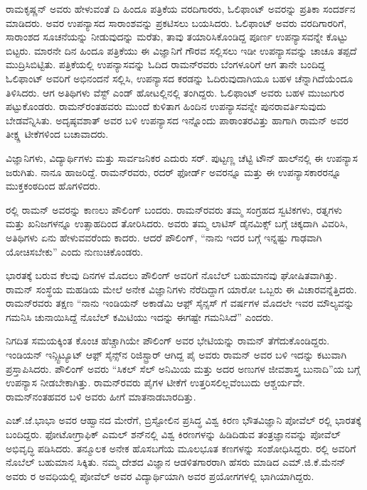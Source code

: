 ರಾಮಕೃಷ್ಣನ್ ಅವರು ಹೇಳುವಂತೆ ದಿ ಹಿಂದೂ ಪತ್ರಿಕೆಯ ವರದಿಗಾರರು, ಓಲಿಫಾಂಟ್ ಅವರನ್ನು ಪ್ರತಿಕಾ ಸಂದರ್ಶನ ಮಾಡಿದರು. ಅವರ ಉಪನ್ಯಾಸದ ಸಾರಾಂಶವನ್ನು ಪ್ರಕಟಿಸಲು ಬಯಸಿದರು. ಓಲಿಫಾಂಟ್ ಅವರು ವರದಿಗಾರರಿಗೆ, ಸಾರಾಂಶದ ಸೂಚನೆಯನ್ನು ನೀಡುವುದನ್ನು ಮರೆತು, ತಾವು ತಯಾರಿಸಿಕೊಂಡಿದ್ದ ಪೂರ್ಣ ಉಪನ್ಯಾಸವನ್ನೇ ಕೊಟ್ಟು ಬಿಟ್ಟರು. ಮಾರನೇ ದಿನ ಹಿಂದೂ ಪತ್ರಿಕೆಯು ಈ ವಿಜ್ಞಾನಿಗೆ ಗೌರವ ಸಲ್ಲಿಸಲು ಇಡೀ ಉಪನ್ಯಾಸವನ್ನು ಚಾಚೂ ತಪ್ಪದೆ ಮುದ್ರಿಸಿಬಿಟ್ಟಿತು. ಪತ್ರಿಕೆಯಲ್ಲಿ ಉಪನ್ಯಾಸವನ್ನು ಓದಿದ ರಾಮನ್‍ರವರು ಬೆಂಗಳೂರಿಗೆ ಆಗ ತಾನೇ ಬಂದಿದ್ದ ಓಲಿಫಾಂಟ್ ಅವರಿಗೆ ಅಭಿನಂದನೆ ಸಲ್ಲಿಸಿ, ಉಪನ್ಯಾಸದ ಕರಡನ್ನು ಓದಿರುವುದಾಗಿಯೂ ಬಹಳ ಚೆನ್ನಾಗಿದೆಯೆಂದೂ ತಿಳಿಸಿದರು. ಆಗ ಅತಿಥಿಗಳು ವೆಸ್ಟ್ ಎಂಡ್ ಹೋಟಲ್ಲಿನಲ್ಲಿ ತಂಗಿದ್ದರು. ಓಲಿಫಾಂಟ್ ಅವರು ಬಹಳ ಮುಜುಗುರ ಪಟ್ಟುಕೊಂಡರು. ರಾಮನ್‍ರಂತಹವರು ಮುಂದೆ ಕುಳಿತಾಗ ಹಿಂದಿನ ಉಪನ್ಯಾಸವನ್ನೇ ಪುನರಾವರ್ತಿಸುವುದು ಬೇಡವೆನ್ನಿಸಿತು. ಅದೃಷ್ಠವಶಾತ್ ಅವರ ಬಳಿ ಉಪನ್ಯಾಸದ ಇನ್ನೊಂದು ಪಾಠಾಂತರವಿತ್ತು ಹಾಗಾಗಿ ರಾಮನ್ ಅವರ ತೀಕ್ಷ್ಣ ಟೀಕೆಗಳಿಂದ ಬಚಾವಾದರು.

ವಿಜ್ಞಾನಿಗಳು, ವಿದ್ಯಾರ್ಥಿಗಳು ಮತ್ತು ಸಾರ್ವಜನಿಕರ ಎದುರು ಸರ್. ಪುಟ್ಟಣ್ಣ ಚೆಟ್ಟಿ ಟೌನ್ ಹಾಲ್‍ನಲ್ಲಿ ಈ ಉಪನ್ಯಾಸ ಜರುಗಿತು. ನಾನೂ ಹಾಜರಿದ್ದೆ. ರಾಮನ್‍ರವರು, ರದರ್ ಫೋರ್ಡ್ ಅವರನ್ನೂ ಮತ್ತು ಈ ಉಪನ್ಯಾಸಕಾರರನ್ನೂ ಮುಕ್ತಕಂಠದಿಂದ ಹೊಗಳಿದರು.



ರಲ್ಲಿ ರಾಮನ್ ಅವರನ್ನು ಕಾಣಲು ಪೌಲಿಂಗ್ ಬಂದರು. ರಾಮನ್‍ರವರು ತಮ್ಮ ಸಂಗ್ರಹದ ಸ್ವಟಿಕಗಳು, ರತ್ನಗಳು ಮತ್ತು ಖನಿಜಗಳನ್ನೂ ಉತ್ಸಾಹದಿಂದ ತೋರಿಸಿದರು. ಅವರು ತಮ್ಮ ಲಾಟಿಸ್ ಡೈನಮಿಕ್ಸ್ ಬಗ್ಗೆ ಚಿಕ್ಕದಾಗಿ ವಿವರಿಸಿ, ಅತಿಥಿಗಳು ಏನು ಹೇಳುವವರೆಂದು ಕಾದರು. ಆದರೆ ಪೌಲಿಂಗ್, “ನಾನು ಇದರ ಬಗ್ಗೆ ಇನ್ನಷ್ಟು ಗಾಢವಾಗಿ ಯೋಚಿಸಬೇಕು” ಎಂದು ನುಣುಚಿಕೊಂಡರು.

\newpage

ಭಾರತಕ್ಕೆ ಬರುವ ಕೆಲವು ದಿನಗಳ ಮೊದಲು ಪೌಲಿಂಗ್ ಅವರಿಗೆ ನೊಬೆಲ್ ಬಹುಮಾನವು ಘೋಷಿತವಾಗಿತ್ತು. ರಾಮನ್ ಸಂಸ್ಥೆಯ ಮಹಡಿಯ ಮೇಲೆ ಅನೇಕ ವಿಜ್ಞಾನಿಗಳು ನೆರೆದಿದ್ದಾಗ ಯಾರೋ ಒಬ್ಬರು ಈ ವಿಚಾರವನ್ನೆತ್ತಿದರು. ರಾಮನ್‍ರವರು ತಕ್ಷಣ “ನಾನು ಇಂಡಿಯನ್ ಅಕಾಡೆಮಿ ಆಫ಼್ ಸೈನ್ಸಸ್ ಗೆ ವರ್ಷಗಳ ಮೊದಲೇ ಇವರ ಮೌಲ್ಯವನ್ನು ಗಮನಿಸಿ ಚುನಾಯಿಸಿದ್ದೆ ನೊಬೆಲ್ ಕಮಿಟಿಯು ಇದನ್ನು ಈಗಷ್ಟೇ ಗಮನಿಸಿದೆ” ಎಂದರು.

ನಿಗದಿತ ಸಮಯಕ್ಕಿಂತ ಕೊಂಚ ಹೆಚ್ಚಾಗಿಯೇ ಪೌಲಿಂಗ್ ಅವರ ಭೇಟಿಯನ್ನು ರಾಮನ್ ತೆಗೆದುಕೊಂಡಿದ್ದರು. ಇಂಡಿಯನ್ ಇನ್ಸ್ಟಿಟ್ಯೂಟ್ ಆಫ಼್ ಸೈನ್ಸ್‌ನ ರಿಜಿಸ್ಟ್ರಾರ್ ಆಗಿದ್ದ ಪೈ ಅವರು ರಾಮನ್ ಅವರ ಬಳಿ ಇದನ್ನು ಕಟುವಾಗಿ ಪ್ರಸ್ತಾಪಿಸಿದರು. ಪೌಲಿಂಗ್ ಅವರು “ಸಿಕಲ್ ಸೆಲ್ ಅನಿಮಿಯ ಮತ್ತು ಅದರ ಅಣುಗಳ ಜೀವಶಾಸ್ತ್ರ ಬುನಾದಿ”ಯ ಬಗ್ಗೆ ಉಪನ್ಯಾಸ ನೀಡಬೇಕಾಗಿತ್ತು. ರಾಮನ್‍ರವರು ಪೈಗಳ ಟೀಕೆಗೆ ಉತ್ತರಿಸಲಿಲ್ಲವೆಂಬುದು ಆಶ್ಚರ್ಯವೇ. ರಾಮನ್‍ನಂತಹವರ ಬಳಿ ಅವರು ಹೀಗೆ ಮಾತನಾಡಬಾರದಿತ್ತು.



ಎಚ್.ಜೆ.ಭಾಭಾ ಅವರ ಆಹ್ವಾನದ ಮೇರೆಗೆ, ಬ್ರಿಸ್ಟೋಲಿನ ಪ್ರಸಿದ್ಧ ವಿಶ್ವ ಕಿರಣ ಭೌತವಿಜ್ಞಾನಿ ಪೋವೆಲ್ ರಲ್ಲಿ ಭಾರತಕ್ಕೆ ಬಂದಿದ್ದರು. ಫೋಟೋಗ್ರಾಫಿಕ್ ಎಮಲ್ ಶನ್‍ನಲ್ಲಿ ವಿಶ್ವ ಕಿರಣಗಳನ್ನು ಹಿಡಿದಿಡುವ ತಂತ್ರಜ್ಞಾನವನ್ನು ಪೋವೆಲ್ ಅಭಿವೃದ್ಧಿ ಪಡಿಸಿದರು. ತನ್ಮೂಲಕ ಅನೇಕ ಹೊಸಬಗೆಯ ಮೂಲಭೂತ ಕಣಗಳನ್ನು ಸಂಶೋಧಿಸಿದ್ದರು. ರಲ್ಲಿ ಅವರಿಗೆ ನೊಬೆಲ್ ಬಹುಮಾನ ಸಿಕ್ಕಿತು. ನಮ್ಮ ದೇಶದ ವಿಜ್ಞಾನ ಆಡಳಿತಗಾರರಾಗಿ ಹೆಸರು ಮಾಡಿದ ಎಮ್.ಜಿ.ಕೆ.ಮೆನನ್ ಅವರು ರ ಅವಧಿಯಲ್ಲಿ ಪೋವೆಲ್ ಅವರ ವಿದ್ಯಾರ್ಥಿಯಾಗಿ ಅವರ ಪ್ರಯೋಗಗಳಲ್ಲಿ ಭಾಗಿಯಾಗಿದ್ದರು.

